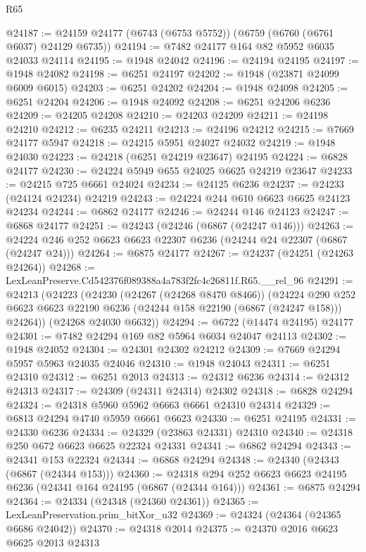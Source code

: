 \begin{lexlean}{R65}
\begin{coremodule}
{@24187 := @24159 @24177 (@6743 (@6753 @5752)) (@6759 (@6760 (@6761 @6037) @24129 @6735))
@24194 := @7482 @24177 @164 @82 @5952 @6035 @24033 @24114
@24195 := @1948 @24042
@24196 := @24194 @24195
@24197 := @1948 @24082
@24198 := @6251 @24197
@24202 := @1948 (@23871 @24099 @6009 @6015)
@24203 := @6251 @24202
@24204 := @1948 @24098
@24205 := @6251 @24204
@24206 := @1948 @24092
@24208 := @6251 @24206 @6236
@24209 := @24205 @24208
@24210 := @24203 @24209
@24211 := @24198 @24210
@24212 := @6235 @24211
@24213 := @24196 @24212
@24215 := @7669 @24177 @5947
@24218 := @24215 @5951 @24027 @24032
@24219 := @1948 @24030
@24223 := @24218 (@6251 @24219 @23647) @24195
@24224 := @6828 @24177
@24230 := @24224 @5949 @655 @24025 @6625 @24219 @23647
@24233 := @24215 @725 @6661 @24024
@24234 := @24125 @6236
@24237 := @24233 (@24124 @24234) @24219
@24243 := @24224 @244 @610 @6623 @6625 @24123 @24234
@24244 := @6862 @24177
@24246 := @24244 @146 @24123
@24247 := @6868 @24177
@24251 := @24243 (@24246 (@6867 (@24247 @146)))
@24263 := @24224 @246 @252 @6623 @6623 @22307 @6236 (@24244 @24 @22307 (@6867 (@24247 @24)))
@24264 := @6875 @24177
@24267 := @24237 (@24251 (@24263 @24264))
@24268 := LexLeanPreserve.Cd542376f089388a4a783f2fc4c26811f.R65.__rel_96
@24291 := @24213
    (@24223
      (@24230
        (@24267 (@24268 @8470 @8466))
        (@24224
          @290
          @252
          @6623
          @6623
          @22190
          @6236
          (@24244 @158 @22190 (@6867 (@24247 @158)))
          @24264))
      (@24268 @24030 @6632))
@24294 := @6722 (@14474 @24195) @24177
@24301 := @7482 @24294 @169 @82 @5964 @6034 @24047 @24113
@24302 := @1948 @24052
@24304 := @24301 @24302 @24212
@24309 := @7669 @24294 @5957 @5963 @24035 @24046
@24310 := @1948 @24043
@24311 := @6251 @24310
@24312 := @6251 @2013
@24313 := @24312 @6236
@24314 := @24312 @24313
@24317 := @24309 (@24311 @24314) @24302
@24318 := @6828 @24294
@24324 := @24318 @5960 @5962 @6663 @6661 @24310 @24314
@24329 := @6813 @24294 @4740 @5959 @6661 @6623
@24330 := @6251 @24195
@24331 := @24330 @6236
@24334 := @24329 (@23863 @24331) @24310
@24340 := @24318 @250 @672 @6623 @6625 @22324 @24331
@24341 := @6862 @24294
@24343 := @24341 @153 @22324
@24344 := @6868 @24294
@24348 := @24340 (@24343 (@6867 (@24344 @153)))
@24360 := @24318 @294 @252 @6623 @6623 @24195 @6236 (@24341 @164 @24195 (@6867 (@24344 @164)))
@24361 := @6875 @24294
@24364 := @24334 (@24348 (@24360 @24361))
@24365 := LexLeanPreservation.prim_bitXor_u32
@24369 := @24324 (@24364 (@24365 @6686 @24042))
@24370 := @24318 @2014
@24375 := @24370 @2016 @6623 @6625 @2013 @24313
}
\end{coremodule}
\end{lexlean}
